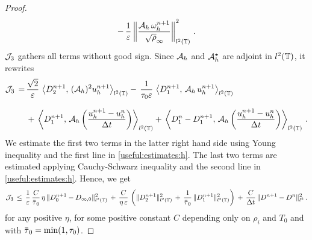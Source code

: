 \documentclass[11pt]{amsart}
\numberwithin{equation}{section}
\numberwithin{figure}{section}
\begin{document}
\begin{proof}
\[	 -\,\frac{1}{\varepsilon}\left\|
	 \frac{{\mathcal A}_h\,\omega^{n+1}_h}{\sqrt{\rho}_{\infty}}
	 \right\|^2_{l^2\left({\mathbb T}\right)}\,.
	\]
	${\mathcal J}_3$ gathers all terms without good sign. Since ${\mathcal A}_h$ and ${\mathcal A}^\star_h$ are adjoint in $l^2({\mathbb T})$, it rewrites 
	\begin{align*}
	{\mathcal J}_3\,=\,
	&\frac{\sqrt{2}}{\varepsilon}\,\left\langle
	D_2^{n+1}
	,\, ({\mathcal A}_h)^2 u_h^{n+1}\right\rangle_{l^2\left({\mathbb T}\right)}
	-\,\frac{1}{\tau_0\varepsilon}\,\left\langle D^{n+1}_1
	,\, {\mathcal A}_h\,u_h^{n+1}\right\rangle_{l^2\left({\mathbb T}\right)}\\[0.8em]
	&+\,
	\left\langle D^{n+1}_1,\,{\mathcal A}_h\left(\frac{u^{n+1}_h- u^{n}_h}{\Delta t}\right)\right\rangle_{l^2\left({\mathbb T}\right)}
	+\,
	\left\langle D^{n}_1 - D^{n+1}_1,\,{\mathcal A}_h\left(\frac{u^{n+1}_h- u^{n}_h}{\Delta t}\right)\right\rangle_{l^2\left({\mathbb T}\right)}
	\,.
	\end{align*}
	We estimate the first two terms in the latter right hand side
        using Young inequality and the first line in
        \eqref{useful:estimates:h}. The last two terms are estimated
        applying Cauchy-Schwarz inequality and the second line in
        \eqref{useful:estimates:h}. Hence, we get
	$$
	\cJ_3\,\leq\, \frac{1}{\eps}\,
	\frac{C}{\ols{\tau}_0}\,\eta\, \| D^{n+1}_0-D_{\infty,0}
	\|_{l^2\left(\T\right)}^2 \,+\, \frac{C}{\eta\,\eps}\, \left( \| D^{n+1}_2\|_{l^2\left(\T\right)}^2 \,+\,\frac{1}{\ols{\tau}_0}\, \| D^{n+1}_1\|_{l^2\left(\T\right)}^2\right)
	\,+\,
	\frac{C}{\Delta t}\,
	\| D^{n+1}- D^n\|_{l^2}^2
	\,.
	$$
	for any positive $\eta$, for some positive constant $C$ depending
	only on $\rho_i$ and $T_0$ and with $\ols{\tau}_0=\min(1,\tau_0)$.

\end{proof}
\end{document}
